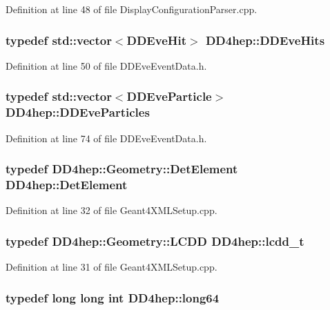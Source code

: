 Definition at line 48 of file DisplayConfigurationParser.cpp.\hypertarget{namespace_d_d4hep_a5e3dc9e6071a76b39c0274507645600c}{
\subsubsection[{DDEveHits}]{\setlength{\rightskip}{0pt plus 5cm}typedef std::vector$<${\bf DDEveHit}$>$ {\bf DD4hep::DDEveHits}}}
\label{namespace_d_d4hep_a5e3dc9e6071a76b39c0274507645600c}


Definition at line 50 of file DDEveEventData.h.\hypertarget{namespace_d_d4hep_a85a43876137cdbe2bd77272afb14586b}{
\subsubsection[{DDEveParticles}]{\setlength{\rightskip}{0pt plus 5cm}typedef std::vector$<${\bf DDEveParticle}$>$ {\bf DD4hep::DDEveParticles}}}
\label{namespace_d_d4hep_a85a43876137cdbe2bd77272afb14586b}


Definition at line 74 of file DDEveEventData.h.\hypertarget{namespace_d_d4hep_a21dd977310ff183f61ca6ae14b59a989}{
\subsubsection[{DetElement}]{\setlength{\rightskip}{0pt plus 5cm}typedef {\bf DD4hep::Geometry::DetElement} {\bf DD4hep::DetElement}}}
\label{namespace_d_d4hep_a21dd977310ff183f61ca6ae14b59a989}


Definition at line 32 of file Geant4XMLSetup.cpp.\hypertarget{namespace_d_d4hep_a9d7154801ec259f2a1d2fe015d140518}{
\subsubsection[{lcdd\_\-t}]{\setlength{\rightskip}{0pt plus 5cm}typedef {\bf DD4hep::Geometry::LCDD} {\bf DD4hep::lcdd\_\-t}}}
\label{namespace_d_d4hep_a9d7154801ec259f2a1d2fe015d140518}


Definition at line 31 of file Geant4XMLSetup.cpp.\hypertarget{namespace_d_d4hep_ac2a70e722b33dc7ddaa20db8954ac836}{
\subsubsection[{long64}]{\setlength{\rightskip}{0pt plus 5cm}typedef long long int {\bf DD4hep::long64}}}
\label{namespace_d_d4hep_ac2a70e722b33dc7ddaa20db8954ac836}


